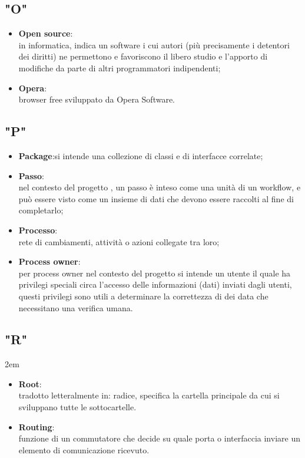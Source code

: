 \subsection*{"O"}
\begin{itemize}
\itemsep2em
\item \textbf{Open source}:\\ in informatica, indica un software i cui autori (più precisamente i detentori dei diritti) ne permettono e favoriscono il libero studio e l'apporto di modifiche da parte di altri programmatori indipendenti;
\item \textbf{Opera}:\\ browser free sviluppato da Opera Software.
\end{itemize}

\subsection*{"P"}
\begin{itemize}
\itemsep2em
\item \textbf{Package}:si intende una collezione di classi e di interfacce correlate;
\item \textbf{Passo}:\\ nel contesto del progetto \progetto{}, un passo è inteso come una unità di un workflow, e può essere visto come un insieme di dati che devono essere raccolti al fine di completarlo;
\item \textbf{Processo}:\\ rete di cambiamenti, attività o azioni collegate tra loro;
\item \textbf{Process owner}:\\ per process owner nel contesto del progetto si intende un utente il quale ha privilegi speciali circa l'accesso delle informazioni (dati) inviati dagli utenti, questi privilegi sono utili a determinare la correttezza di dei data che necessitano una verifica umana.
\end{itemize}
\subsection*{"R"}
\itemsep2em
\begin{itemize}
\item \textbf{Root}:\\ tradotto letteralmente in: radice, specifica la cartella principale da cui si sviluppano tutte le sottocartelle.
\item \textbf{Routing}:\\ funzione di un commutatore che decide su quale porta o interfaccia inviare un elemento di comunicazione ricevuto.
\end{itemize}
